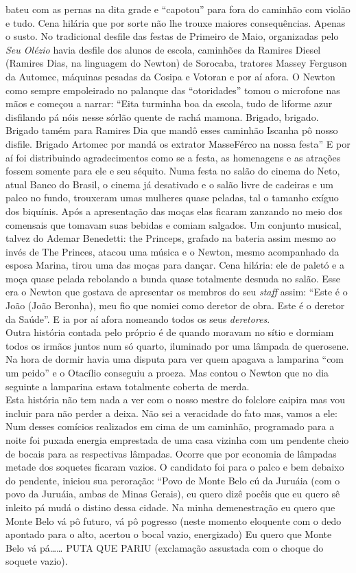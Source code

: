 \documentclass[12pt,brazil,]{book}
\begin{document}
bateu com as pernas na dita grade e ``capotou'' para fora do caminhão
com violão e tudo. Cena hilária que por sorte não lhe trouxe maiores
consequências. Apenas o susto. No tradicional desfile das festas de
Primeiro de Maio, organizadas pelo \emph{Seu Olézio} havia desfile dos
alunos de escola, caminhões da Ramires Diesel (Ramires Dias, na
linguagem do Newton) de Sorocaba, tratores Massey Ferguson da Automec,
máquinas pesadas da Cosipa e Votoran e por aí afora. O Newton como
sempre empoleirado no palanque das ``otoridades'' tomou o microfone nas
mãos e começou a narrar: ``Eita turminha boa da escola, tudo de liforme
azur disfilando pá nóis nesse sórlão quente de rachá mamona. Brigado,
brigado. Brigado tamém para Ramires Dia que mandô esses caminhão Iscanha
pô nosso disfile. Brigado Artomec por mandá os extrator MasseFérco na
nossa festa'' E por aí foi distribuindo agradecimentos como se a festa,
as homenagens e as atrações fossem somente para ele e seu séquito. Numa
festa no salão do cinema do Neto, atual Banco do Brasil, o cinema já
desativado e o salão livre de cadeiras e um palco no fundo, trouxeram
umas mulheres quase peladas, tal o tamanho exíguo dos biquínis. Após a
apresentação das moças elas ficaram zanzando no meio dos comensais que
tomavam suas bebidas e comiam salgados. Um conjunto musical, talvez do
Ademar Benedetti: the Princeps, grafado na bateria assim mesmo ao invés
de The Princes, atacou uma música e o Newton, mesmo acompanhado da
esposa Marina, tirou uma das moças para dançar. Cena hilária: ele de
paletó e a moça quase pelada rebolando a bunda quase totalmente desnuda
no salão. Esse era o Newton que gostava de apresentar os membros do seu
\emph{staff} assim: ``Este é o João (João Beronha), meu fio que nomiei
como deretor de obra. Este é o deretor da Saúde''. E ia por aí afora
nomeando todos os seus \emph{deretores}.\\
Outra história contada pelo próprio é de quando moravam no sítio e
dormiam todos os irmãos juntos num só quarto, iluminado por uma lâmpada
de querosene. Na hora de dormir havia uma disputa para ver quem apagava
a lamparina ``com um peido'' e o Otacílio conseguiu a proeza. Mas contou
o Newton que no dia seguinte a lamparina estava totalmente coberta de
merda.\\
Esta história não tem nada a ver com o nosso mestre do folclore caipira
mas vou incluir para não perder a deixa. Não sei a veracidade do fato
mas, vamos a ele: Num desses comícios realizados em cima de um caminhão,
programado para a noite foi puxada energia emprestada de uma casa
vizinha com um pendente cheio de bocais para as respectivas lâmpadas.
Ocorre que por economia de lâmpadas metade dos soquetes ficaram vazios.
O candidato foi para o palco e bem debaixo do pendente, iniciou sua
peroração: ``Povo de Monte Belo cú da Juruáia (com o povo da Juruáia,
ambas de Minas Gerais), eu quero dizê pocêis que eu quero sê inleito pá
mudá o distino dessa cidade. Na minha demenestração eu quero que Monte
Belo vá pô futuro, vá pô pogresso (neste momento eloquente com o dedo
apontado para o alto, acertou o bocal vazio, energizado) Eu quero que
Monte Belo vá pá\ldots{}\ldots{} PUTA QUE PARIU (exclamação assustada
com o choque do soquete vazio).
\end{document}
